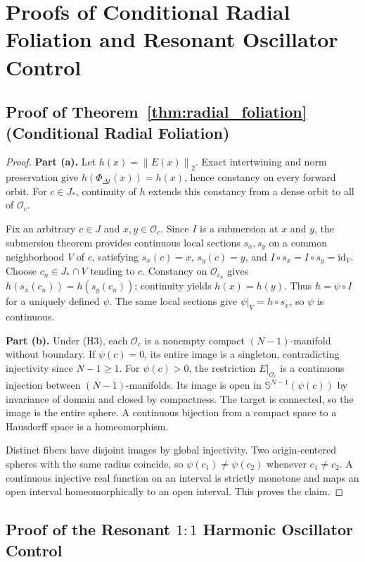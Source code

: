 \documentclass[10pt]{article}
\theoremstyle{definition}
\theoremstyle{remark}
\newcommand{\Sp}{\mathbb{S}}
\newcommand{\norm}[1]{\left\lVert #1 \right\rVert}
\begin{document}
\section{Proofs of Conditional Radial Foliation and Resonant Oscillator Control}
\label{app:foliation_proofs}

\subsection{Proof of Theorem~\ref{thm:radial_foliation} (Conditional Radial Foliation)}

\begin{proof}
\textbf{Part (a).} Let $h(x)=\norm{E(x)}_2$. Exact intertwining and norm preservation give $h(\Phi_{\Delta t}(x))=h(x)$, hence constancy on every forward orbit. For $c\in J_*$, continuity of $h$ extends this constancy from a dense orbit to all of $\mathcal O_c$.

Fix an arbitrary $c\in J$ and $x,y\in\mathcal O_c$. Since $I$ is a submersion at $x$ and $y$, the submersion theorem provides continuous local sections $s_x,s_y$ on a common neighborhood $V$ of $c$, satisfying $s_x(c)=x$, $s_y(c)=y$, and $I\circ s_x=I\circ s_y=\mathrm{id}_V$. Choose $c_n\in J_*\cap V$ tending to $c$. Constancy on $\mathcal O_{c_n}$ gives $h(s_x(c_n))=h(s_y(c_n))$; continuity yields $h(x)=h(y)$. Thus $h=\psi\circ I$ for a uniquely defined $\psi$. The same local sections give $\psi|_V=h\circ s_x$, so $\psi$ is continuous.

\textbf{Part (b).} Under (H3), each $\mathcal O_c$ is a nonempty compact $(N-1)$-manifold without boundary. If $\psi(c)=0$, its entire image is a singleton, contradicting injectivity since $N-1\ge1$. For $\psi(c)>0$, the restriction $E|_{\mathcal O_c}$ is a continuous injection between $(N-1)$-manifolds. Its image is open in $\Sp^{N-1}(\psi(c))$ by invariance of domain and closed by compactness. The target is connected, so the image is the entire sphere. A continuous bijection from a compact space to a Hausdorff space is a homeomorphism.

Distinct fibers have disjoint images by global injectivity. Two origin-centered spheres with the same radius coincide, so $\psi(c_1)\ne\psi(c_2)$ whenever $c_1\ne c_2$. A continuous injective real function on an interval is strictly monotone and maps an open interval homeomorphically to an open interval. This proves the claim.
\end{proof}

\subsection{Proof of the Resonant $1:1$ Harmonic Oscillator Control}
\end{document}
